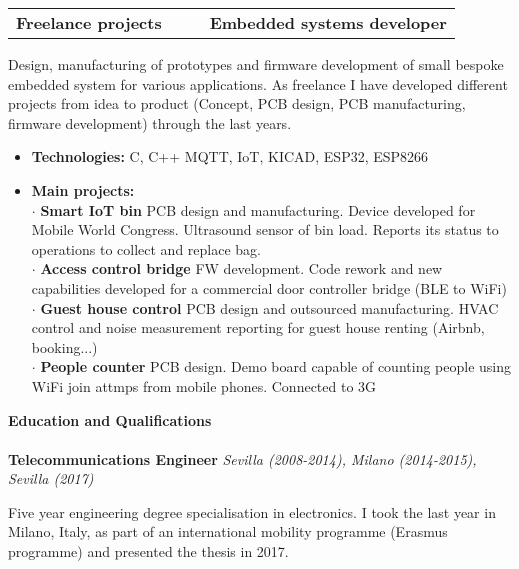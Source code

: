 \documentclass[9pt]{extarticle}
\begin{document}
\begin{table}[H]
\begin{tabularx}{\textwidth}{lcXr}
\textbf{Freelance projects} & & & \textbf{Embedded systems developer}
\end{tabularx}
\end{table}
\par
\hspace{20pt} Design, manufacturing of prototypes and firmware development of small bespoke embedded system for various applications.
As freelance I have developed different projects from idea to product (Concept, PCB design, PCB manufacturing, firmware development) through the last years. 
\begin{itemize}
    \item{\textbf{Technologies:} C, C++ MQTT, IoT, KICAD, ESP32, ESP8266}
    \item{\textbf{Main projects:}}
\\$\cdot$ \textbf{Smart IoT bin} PCB design and manufacturing. Device developed for Mobile World Congress. Ultrasound sensor of bin load. Reports its status to operations to collect and replace bag.
\\$\cdot$ \textbf{Access control bridge} FW development. Code rework and new capabilities developed for a commercial door controller bridge (BLE to WiFi)
\\$\cdot$ \textbf{Guest house control} PCB design and outsourced manufacturing. HVAC control and noise measurement reporting for guest house renting (Airbnb, booking...)
\\$\cdot$ \textbf{People counter} PCB design. Demo board capable of counting people using WiFi join attmps from mobile phones. Connected to 3G 
\end{itemize}
\vspace{1cm}

\textbf{Education and Qualifications}\\\linea\\

\textbf{Telecommunications Engineer}\emph{ Sevilla (2008-2014), Milano (2014-2015), Sevilla (2017)}
\begin{labeling}{\hspace{20pt}}
\item{Five year engineering degree specialisation in electronics. I took the last year in Milano, Italy, as part of an international mobility programme (Erasmus programme) and presented the thesis in 2017.}
\end{labeling}
\end{document}
